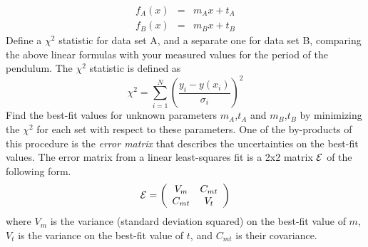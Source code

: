 \documentclass{revtex4}
\begin{document}
\begin{eqnarray}
f_A(x) &=& m_A x + t_A \label{eq:lineA} \\
f_B(x) &=& m_B x + t_B \label{eq:lineB}
\end{eqnarray}
Define a $\chi^2$ statistic for data set A, and a separate one for data
set B, comparing the above linear formulas with your measured values for
the period of the pendulum.  The $\chi^2$ statistic is defined as
\begin{equation}
\chi^2 = \sum_{i=1}^N\left(\frac{y_i-y(x_i)}{\sigma_i}\right)^2
\end{equation}
Find the best-fit values for unknown parameters $m_A$,$t_A$ and $m_B$,$t_B$
by minimizing the $\chi^2$ for each set with respect to these parameters.
One of the by-products of this procedure is the {\em error
matrix} that describes the uncertainties on the best-fit values.  The error
matrix from a linear least-squares fit is a 2x2 matrix $\cal{E}$ of the
following form.
\begin{equation}
\cal{E} = \left(\begin{array}{cc}
V_m & C_{mt} \\
C_{mt} & V_t
\end{array}\right)
\end{equation}
where $V_m$ is the variance (standard deviation squared) on the best-fit
value of $m$, $V_t$ is the variance on the best-fit value of $t$, and
$C_{mt}$ is their covariance.
\end{document}
